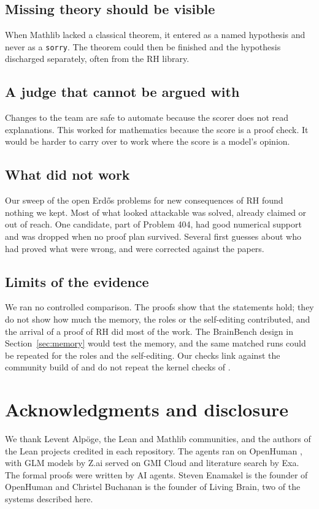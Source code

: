 \documentclass[11pt]{amsart}
\newcommand{\lean}[1]{\texttt{#1}}
\begin{document}
\subsection*{Missing theory should be visible} When Mathlib lacked a classical theorem, it entered as a named hypothesis and never as a \lean{sorry}. The theorem could then be finished and the hypothesis discharged separately, often from the RH library.

\subsection*{A judge that cannot be argued with} Changes to the team are safe to automate because the scorer does not read explanations. This worked for mathematics because the score is a proof check. It would be harder to carry over to work where the score is a model's opinion.

\subsection*{What did not work} Our sweep of the open Erd\H{o}s problems for new consequences of RH found nothing we kept. Most of what looked attackable was solved, already claimed or out of reach. One candidate, part of Problem 404, had good numerical support and was dropped when no proof plan survived. Several first guesses about who had proved what were wrong, and were corrected against the papers.

\subsection*{Limits of the evidence} We ran no controlled comparison. The proofs show that the statements hold; they do not show how much the memory, the roles or the self-editing contributed, and the arrival of a proof of RH did most of the work. The BrainBench design in Section~\ref{sec:memory} would test the memory, and the same matched runs could be repeated for the roles and the self-editing. Our checks link against the community build of \cite{rhrepo} and do not repeat the kernel checks of \cite{sutherland}.

\section*{Acknowledgments and disclosure}

We thank Levent Alp\"oge, the Lean and Mathlib communities, and the authors of the Lean projects credited in each repository. The agents ran on OpenHuman \cite{openhuman}, with GLM models by Z.ai served on GMI Cloud and literature search by Exa. The formal proofs were written by AI agents. Steven Enamakel is the founder of OpenHuman and Christel Buchanan is the founder of Living Brain, two of the systems described here.
\end{document}

